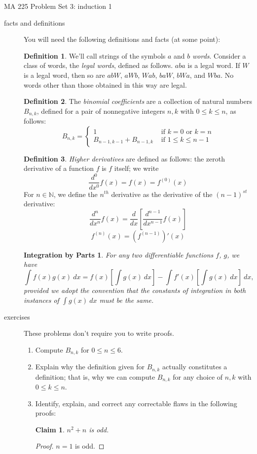 \documentclass[11pt]{letter}
\newtheorem*{IBP}{Integration by Parts}
\newtheorem{claim}{Claim}
\theoremstyle{definition}
\newtheorem{defn}{Definition}
\begin{document}
\pagestyle{empty}

{\Large MA 225 Problem Set 3: induction 1}\\

\begin{description}
	\item[facts and definitions] You will need the following definitions and facts (at some point):
			\begin{defn}
				We'll call strings of the symbols $a$ and $b$ {\em words}. Consider a class of words, the {\em legal words}, defined as follows. $aba$ is a legal word. If $W$ is a legal word, then so are $abW$, $aWb$, $Wab$, $baW$, $bWa$, and $Wba$. No words other than those obtained in this way are legal.
			\end{defn}
			\begin{defn}
				The {\em binomial coefficients} are a collection of natural numbers $B_{n,k}$, defined for a pair of nonnegative integers $n,k$ with  $0\leq k\leq n$, as follows:
				$$B_{n,k}=\begin{cases}1 & \text{ if } k=0\text{ or }k=n\\B_{n-1,k-1}+B_{n-1,k} & \text{ if }1\leq k\leq n-1\end{cases}$$
			\end{defn}
			
			\begin{defn}
				{\em Higher derivatives} are defined as follows: the zeroth derivative of a function $f$ is $f$ itself; we write
					$$\frac{d^0}{dx^0}f(x)=f(x)=f^{(0)}(x)$$
				For $n\in \mathbb{N}$, we define the $n^{th}$ derivative as the derivative of the $(n-1)^{st}$ derivative:
					$$\frac{d^n}{dx^n}f(x)=\frac{d}{dx}\left[\frac{d^{n-1}}{dx^{n-1}} f(x)\right]$$
					$$f^{(n)}(x)=\left(f^{(n-1)}\right)'(x)$$
			\end{defn}
			
			\begin{IBP}
				For any two differentiable functions $f$, $g$, we have
				 $$\int f(x)g(x)\ dx = f(x)\left[\int g(x)\ dx\right]-\int f'(x)\left[\int g(x)\ dx\right]\ dx,$$ provided we adopt the convention that the constants of integration in both instances of $\int g(x)\ dx$ must be the same.
			\end{IBP}

	\item[exercises]  These problems don't require you to write proofs.
		\begin{enumerate}
			\item Compute $B_{n,k}$ for $0\leq n\leq 6$.
			\item Explain why the definition given for $B_{n,k}$ actually constitutes a definition; that is, why we can compute $B_{n,k}$ for any choice of $n,k$ with $0\leq k\leq n$.
			\item Identify, explain, and correct any correctable flaws in the following proofs:
				\begin{claim}
					$n^2+n$ is odd.
				\end{claim}
				\begin{proof}
					$n=1$ is odd.
					

\end{proof}
\end{enumerate}
\end{description}
\end{document}
